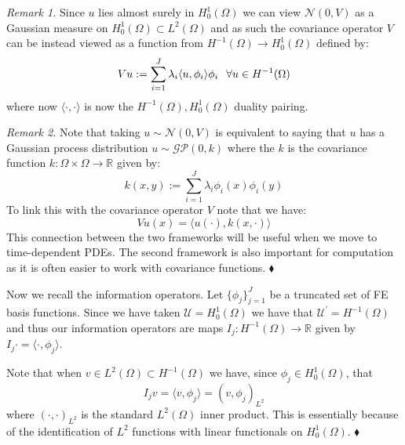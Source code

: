 \begin{remarks}
    \textit{Remark 1.} Since $u$ lies almost surely in $H_{0}^{1}(\Omega)$ we can view $\mathcal{N}(0,V)$ as a Gaussian measure on $H_{0}^{1}(\Omega)\subset L^{2}(\Omega)$ and as such the covariance operator $V$ can be instead viewed as a function from $H^{-1}(\Omega)\rightarrow H_{0}^{1}(\Omega)$ defined by:
    \begin{equation}
        Vu := \sum_{i=1}^{J}\lambda_{i}\langle u, \phi_{i}\rangle\phi_{i} \hspace{0.25cm} \forall u\in H^{-1}(\Omega)
    \end{equation}
    where now $\langle\boldsymbol{\cdot},\boldsymbol{\cdot}\rangle$ is now the $H^{-1}(\Omega),H_{0}^{1}(\Omega)$ duality pairing.

    \noindent \textit{Remark 2.} Note that taking $u\sim\mathcal{N}(0,V)$ is equivalent to saying that $u$ has a Gaussian process distribution $u\sim\mathcal{G}\mathcal{P}(0,k)$ where the $k$ is the covariance function $k:\Omega\times\Omega\rightarrow\mathbb{R}$ given by:
    \begin{equation}
        \label{cov_function_FEM_prior}
        k(x,y):=\sum_{i=1}^{J}\lambda_{i}\phi_{i}(x)\phi_{i}(y)
    \end{equation}
    To link this with the covariance operator $V$ note that we have:
    \begin{equation}
        Vu(x)=\langle u(\boldsymbol{\cdot}), k(x,\boldsymbol{\cdot})\rangle
    \end{equation}
    This connection between the two frameworks will be useful when we move to time-dependent PDEs. The second framework is also important for computation as it is often easier to work with covariance functions.
    $\mathbin{\blacklozenge}$
\end{remarks}
Now we recall the information operators. Let $\{\phi_{j}\}_{j=1}^{J}$ be a truncated set of FE basis functions. Since we have taken $\mathcal{U}=H_{0}^{1}(\Omega)$ we have that $\mathcal{U}^{\prime}=H^{-1}(\Omega)$ and thus our information operators are maps $I_{j}:H^{-1}(\Omega)\rightarrow\mathbb{R}$ given by $I_{j}\boldsymbol{\cdot}=\langle\boldsymbol{\cdot},\phi_{j}\rangle$. \vspace{5pt}

\begin{remark}
    Note that when $v\in L^{2}(\Omega)\subset H^{-1}(\Omega)$ we have, since $\phi_{j}\in H^{1}_{0}(\Omega)$, that
    \begin{equation*}
        I_{j}v=\langle v,\phi_{j}\rangle=(v,\phi_{j})_{L^2}
    \end{equation*}
    where $(\boldsymbol{\cdot},\boldsymbol{\cdot})_{L^2}$ is the standard $L^2(\Omega)$ inner product. This is essentially because of the identification of $L^2$ functions with linear functionals on $H^{1}_{0}(\Omega)$.
    $\mathbin{\blacklozenge}$
\end{remark}

